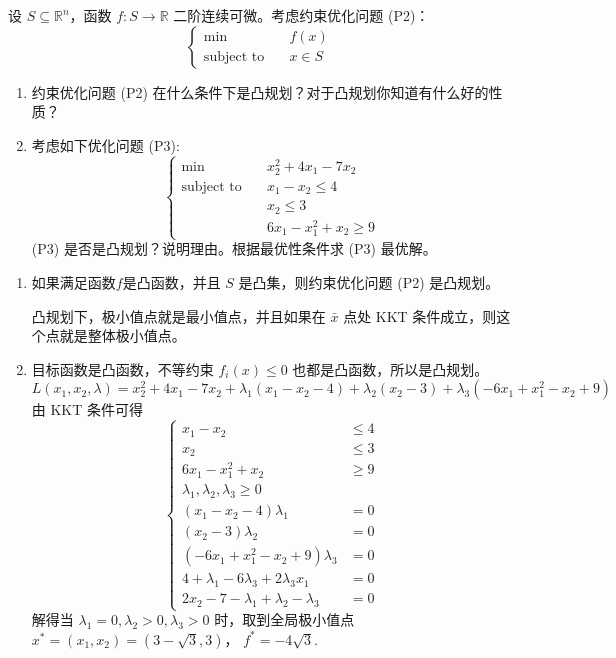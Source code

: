 

\newcommand\Title{最优化方法第 9 次作业}

\newcommand\subject{\operatorname{subject\ to}}


\begin{problem}
    设 $S \subseteq \mathbb{R}^n$，函数 $f: S \to \mathbb{R}$ 二阶连续可微。考虑约束优化问题 (P2)：\[\begin{cases}
        \min\quad &f(x)\\
        \subject \quad &x \in S
    \end{cases}\]
    \begin{enumerate}
        \item 约束优化问题 (P2) 在什么条件下是凸规划？对于凸规划你知道有什么好的性质？
        \item 考虑如下优化问题 (P3):\[\begin{cases}
            \min\quad &x_2^2 + 4x_1 - 7x_2\\
            \subject \quad &x_1 - x_2 \le 4\\
            &x_2 \le 3\\
            & 6x_1 - x_1^2 + x_2 \ge 9
        \end{cases}\]
        (P3) 是否是凸规划？说明理由。根据最优性条件求 (P3) 最优解。
    \end{enumerate}
    \Answer\text{}\begin{enumerate}
        \item 如果满足函数$f$是凸函数，并且 $S$ 是凸集，则约束优化问题 (P2) 是凸规划。
        
        凸规划下，极小值点就是最小值点，并且如果在 $\bar{x}$ 点处 KKT 条件成立，则这个点就是整体极小值点。
        \item 目标函数是凸函数，不等约束 $f_i(x) \le 0$ 也都是凸函数，所以是凸规划。\[L(x_1, x_2, \lambda) = x_2^2 + 4x_1 - 7x_2 + \lambda_1(x_1 - x_2 - 4) + \lambda_2(x_2 - 3) + \lambda_3(-6x_1 + x_1^2 - x_2 + 9)\]
        由 KKT 条件可得\[\begin{cases}
            x_1 - x_2 &\le 4\\
            x_2 &\le 3\\
            6x_1 - x_1^2 + x_2 &\ge 9\\
            \lambda_1, \lambda_2, \lambda_3 \ge 0\\
            (x_1 - x_2 - 4)\lambda_1 &= 0\\
            (x_2 - 3)\lambda_2 &= 0\\
            (-6x_1 + x_1^2 - x_2 + 9)\lambda_3 &= 0\\
            4 + \lambda_1 - 6\lambda_3 + 2\lambda_3x_1 &= 0\\
            2x_2 - 7 - \lambda_1 + \lambda_2 - \lambda_3 &= 0
        \end{cases}\]
        解得当 $\lambda_1 = 0, \lambda_2 > 0, \lambda_3 > 0$ 时，取到全局极小值点 $x^* = (x_1, x_2) = (3 - \sqrt{3}, 3)$， $f^* = -4\sqrt{3}$. 
    \end{enumerate}
\end{problem}

